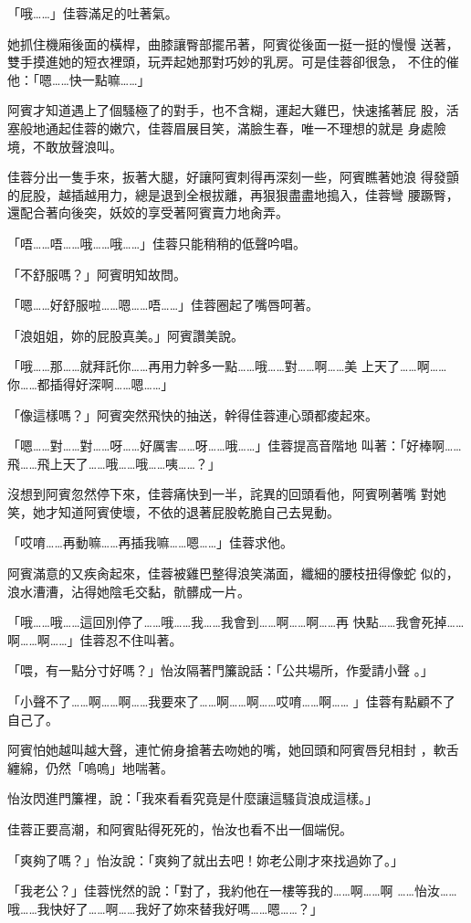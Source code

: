 「哦……」佳蓉滿足的吐著氣。

她抓住機廂後面的橫桿，曲膝讓臀部擺吊著，阿賓從後面一挺一挺的慢慢
送著，雙手摸進她的短衣裡頭，玩弄起她那對巧妙的乳房。可是佳蓉卻很急，
不住的催他：「嗯……快一點嘛……」

阿賓才知道遇上了個騷極了的對手，也不含糊，運起大雞巴，快速搖著屁
股，活塞般地通起佳蓉的嫩穴，佳蓉眉展目笑，滿臉生春，唯一不理想的就是
身處險境，不敢放聲浪叫。

佳蓉分出一隻手來，扳著大腿，好讓阿賓刺得再深刻一些，阿賓瞧著她浪
得發顫的屁股，越插越用力，總是退到全根拔離，再狠狠盡盡地搗入，佳蓉彎
腰蹶臀，還配合著向後突，妖姣的享受著阿賓賣力地肏弄。

「唔……唔……哦……哦……」佳蓉只能稍稍的低聲吟唱。

「不舒服嗎？」阿賓明知故問。

「嗯……好舒服啦……嗯……唔……」佳蓉圈起了嘴唇呵著。

「浪姐姐，妳的屁股真美。」阿賓讚美說。

「哦……那……就拜託你……再用力幹多一點……哦……對……啊……美
上天了……啊……你……都插得好深啊……嗯……」

「像這樣嗎？」阿賓突然飛快的抽送，幹得佳蓉連心頭都痠起來。

「嗯……對……對……呀……好厲害……呀……哦……」佳蓉提高音階地
叫著：「好棒啊……飛……飛上天了……哦……哦……咦……？」

沒想到阿賓忽然停下來，佳蓉痛快到一半，詫異的回頭看他，阿賓咧著嘴
對她笑，她才知道阿賓使壞，不依的退著屁股乾脆自己去晃動。

「哎唷……再動嘛……再插我嘛……嗯……」佳蓉求他。

阿賓滿意的又疾肏起來，佳蓉被雞巴整得浪笑滿面，纖細的腰枝扭得像蛇
似的，浪水漕漕，沾得她陰毛交黏，骯髒成一片。

「哦……哦……這回別停了……哦……我……我會到……啊……啊……再
快點……我會死掉……啊……啊……」佳蓉忍不住叫著。

「喂，有一點分寸好嗎？」怡汝隔著門簾說話：「公共場所，作愛請小聲
。」

「小聲不了……啊……啊……我要來了……啊……啊……哎唷……啊……
」佳蓉有點顧不了自己了。

阿賓怕她越叫越大聲，連忙俯身搶著去吻她的嘴，她回頭和阿賓唇兒相封
，軟舌纏綿，仍然「嗚嗚」地喘著。

怡汝閃進門簾裡，說：「我來看看究竟是什麼讓這騷貨浪成這樣。」

佳蓉正要高潮，和阿賓貼得死死的，怡汝也看不出一個端倪。

「爽夠了嗎？」怡汝說：「爽夠了就出去吧！妳老公剛才來找過妳了。」

「我老公？」佳蓉恍然的說：「對了，我約他在一樓等我的……啊……啊
……怡汝……哦……我快好了……啊……我好了妳來替我好嗎……嗯……？」

